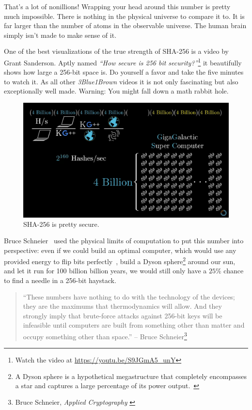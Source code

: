 That's a lot of nonillions! Wrapping your head around this number is
pretty much impossible. There is nothing in the physical universe to
compare it to. It is far larger than the number of atoms in the
observable universe. The human brain simply isn't made to make sense of
it.

One of the best visualizations of the true strength of SHA-256 is a video by
Grant Sanderson. Aptly named \textit{\enquote{How secure is 256 bit
security?}}\footnote{Watch the video at \url{https://youtu.be/S9JGmA5_unY}} it
beautifully shows how large a 256-bit space is. Do yourself a favor and take the
five minutes to watch it. As all other \textit{3Blue1Brown} videos it is not
only fascinating but also exceptionally well made. Warning: You might fall down
a math rabbit hole.

\begin{figure}
  \includegraphics{assets/images/youtube-vid.png}
  \caption{SHA-256 is pretty secure.}
  \label{fig:youtube-vid}
\end{figure}

Bruce Schneier~\cite{web:schneier} used the physical limits of computation to put this
number into perspective: even if we could build an optimal computer,
which would use any provided energy to flip bits perfectly~\cite{wiki:landauer}, build a
Dyson sphere\footnote{A Dyson sphere is a hypothetical megastructure that completely encompasses a star and captures a large percentage of its power output.~\cite{wiki:dyson}} around our sun, and let it run for 100 billion billion
years, we would still only have a $25\%$ chance to find a needle in a
256-bit haystack.

\begin{samepage}\begin{quotation}
\enquote{These numbers have nothing to do with the technology of the devices;
they are the maximums that thermodynamics will allow. And they
strongly imply that brute-force attacks against 256-bit keys will be
infeasible until computers are built from something other than matter
and occupy something other than space.}
\flushright -- Bruce Schneier\footnote{Bruce Schneier, \textit{Applied Cryptography} \cite{bruce-schneier}}
\end{quotation}\end{samepage}

